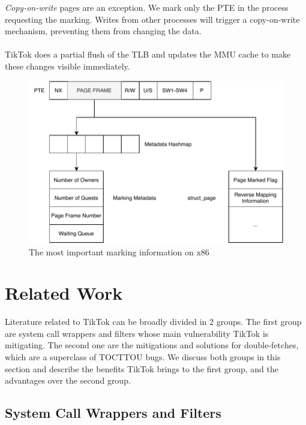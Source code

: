 \emph{Copy-on-write} pages are an exception. We mark only the PTE in the process requesting the marking.
Writes from other processes will trigger a copy-on-write mechanism, preventing them from changing the data.
\\
\\
TikTok does a partial flush of the TLB and updates the MMU cache to make these changes visible immediately.

\begin{figure}[]
  \centering
  \includegraphics[width=\linewidth]{img/book-keeping.pdf}
  \caption{The most important marking information on x86}
  \label{fig:bookkeeping}
\end{figure}



\section{Related Work}
\label{sec:relatedwork}
Literature related to TikTok can be broadly divided in 2 groups. The first group are system call wrappers and filters whose main vulnerability TikTok is mitigating.
The second one are the mitigations and solutions for double-fetches, which are a superclass of TOCTTOU bugs. We discuss both groups in this section and describe the
benefits TikTok brings to the first group, and the advantages over the second group.

\subsection{System Call Wrappers and Filters}

